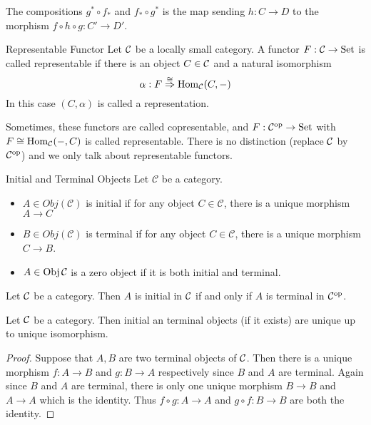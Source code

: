 \documentclass[a4paper]{article}
\begin{document}
The compositions $g^\ast\circ f_\ast$ and $f_\ast\circ g^\ast$ is the map sending $h:C\to D$ to the morphism $f\circ h\circ g:C'\to D'$. 

\begin{defn}{Representable Functor}{} Let $\mathcal{C}$ be a locally small category. A functor $F:\mathcal{C}\to\text{Set}$ is called representable if there is an object $C\in\mathcal{C}$ and a natural isomorphism $$\alpha:F\overset{\cong}{\Rightarrow}\operatorname{Hom}_{\mathcal{C}}(C,-)$$ In this case $(C,\alpha)$ is called a representation. 
\end{defn}

Sometimes, these functors are called copresentable, and $F:\mathcal{C}^{\text{op}}\to\text{Set}$ with $F\cong\operatorname{Hom}_{\mathcal{C}}(-,C)$ is called representable. There is no distinction (replace $\mathcal{C}$ by $\mathcal{C}^{\text{op}}$) and we only talk about representable functors. 

\begin{defn}{Initial and Terminal Objects}{} Let $\mathcal{C}$ be a category. 
\begin{itemize}
\item $A\in Obj(\mathcal{C})$ is initial if for any object $C\in\mathcal{C}$, there is a unique morphism $A\to C$
\item $B\in Obj(\mathcal{C})$ is terminal if for any object $C\in\mathcal{C}$, there is a unique morphism $C\to B$. 
\item $A\in\operatorname{Obj}\mathcal{C}$ is a zero object if it is both initial and terminal. 
\end{itemize}
\end{defn}

\begin{lmm}{}{} Let $\mathcal{C}$ be a category. Then $A$ is initial in $\mathcal{C}$ if and only if $A$ is terminal in $\mathcal{C}^{\text{op}}$. 
\end{lmm}

\begin{prp}{}{} Let $\mathcal{C}$ be a category. Then initial an terminal objects (if it exists) are unique up to unique isomorphism. \tcbline
\begin{proof}
Suppose that $A,B$ are two terminal objects of $\mathcal{C}$. Then there is a unique morphism $f:A\to B$ and $g:B\to A$ respectively since $B$ and $A$ are terminal. Again since $B$ and $A$ are terminal, there is only one unique morphism $B\to B$ and $A\to A$ which is the identity. Thus $f\circ g:A\to A$ and $g\circ f:B\to B$ are both the identity. 
\end{proof}
\end{prp}
\end{document}
